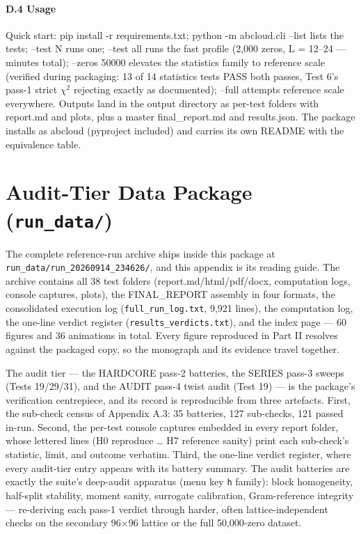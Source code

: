 \documentclass[10pt]{article}
\begin{document}
\paragraph{D.4 Usage}

Quick start: pip install -r requirements.txt; python -m abcloud.cli --list lists the tests; --test N runs one; --test all runs the fast profile (2,000 zeros, L = 12--24 --- minutes total); --zeros 50000 elevates the statistics family to reference scale (verified during packaging: 13 of 14 statistics tests PASS both passes, Test 6's pass-1 strict $\chi$$^2$ rejecting exactly as documented); --full attempts reference scale everywhere. Outputs land in the output directory as per-test folders with report.md and plots, plus a master final\_report.md and results.json. The package installs as abcloud (pyproject included) and carries its own README with the equivalence table.

\section{Audit-Tier Data Package (\texttt{run\_data/})}

The complete reference-run archive ships inside this package at \texttt{run\_data/run\_20260914\_234626/}, and this appendix is its reading guide. The archive contains all 38 test folders (report.md/html/pdf/docx, computation logs, console captures, plots), the FINAL\_REPORT assembly in four formats, the consolidated execution log (\texttt{full\_run\_log.txt}, 9,921 lines), the computation log, the one-line verdict register (\texttt{results\_verdicts.txt}), and the index page --- 60 figures and 36 animations in total. Every figure reproduced in Part II resolves against the packaged copy, so the monograph and its evidence travel together.

The audit tier --- the HARDCORE pass-2 batteries, the SERIES pass-3 sweeps (Tests 19/29/31), and the AUDIT pass-4 twist audit (Test 19) --- is the package's verification centrepiece, and its record is reproducible from three artefacts. First, the sub-check census of Appendix A.3: 35 batteries, 127 sub-checks, 121 passed in-run. Second, the per-test console captures embedded in every report folder, whose lettered lines (H0 reproduce \ldots{} H7 reference sanity) print each sub-check's statistic, limit, and outcome verbatim. Third, the one-line verdict register, where every audit-tier entry appears with its battery summary. The audit batteries are exactly the suite's deep-audit apparatus (menu key \texttt{h} family): block homogeneity, half-split stability, moment sanity, surrogate calibration, Gram-reference integrity --- re-deriving each pass-1 verdict through harder, often lattice-independent checks on the secondary 96$\times$96 lattice or the full 50,000-zero dataset.
\end{document}
